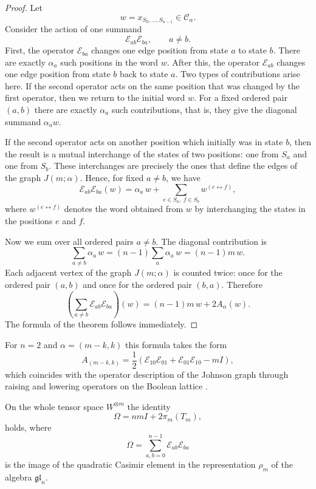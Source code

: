 \documentclass[12pt,reqno]{amsart}
\begin{document}
\begin{proof}
Let
$$
w=x_{S_0,\dots,S_{n-1}}\in\mathcal C_\alpha.
$$
Consider the action of one summand
$$
\mathcal E_{ab}\mathcal E_{ba},
\qquad a\ne b.
$$
First, the operator $\mathcal E_{ba}$ changes one edge position from
state $a$ to state $b$. There are exactly $\alpha_a$ such positions in the
word $w$. After this, the operator $\mathcal E_{ab}$ changes one edge
position from state $b$ back to state $a$. Two types of contributions
arise here. If the second operator acts on the same position that was
changed by the first operator, then we return to the initial word $w$. For
a fixed ordered pair $(a,b)$ there are exactly $\alpha_a$ such
contributions, that is, they give the diagonal summand
$
\alpha_a w.
$

If the second operator acts on another position which initially was in
state $b$, then the result is a mutual interchange of the states of two
positions: one from $S_a$ and one from $S_b$. These interchanges are
precisely the ones that define the edges of the graph $J(m;\alpha)$.
Hence, for fixed $a\ne b$, we have
$$
\mathcal E_{ab}\mathcal E_{ba}(w)
=
\alpha_a\,w
+
\sum_{e\in S_a,\ f\in S_b}
w^{(e\leftrightarrow f)},
$$
where $w^{(e\leftrightarrow f)}$ denotes the word obtained from $w$ by
interchanging the states in the positions $e$ and $f$.

Now we sum over all ordered pairs $a\ne b$. The diagonal contribution is
$$
\sum_{a\ne b}\alpha_a\,w
=
(n-1)\sum_a\alpha_a\,w
=
(n-1)m\,w.
$$
Each adjacent vertex of the graph $J(m;\alpha)$ is counted twice: once for
the ordered pair $(a,b)$ and once for the ordered pair $(b,a)$. Therefore
$$
\left(
\sum_{a\ne b}\mathcal E_{ab}\mathcal E_{ba}
\right)(w)
=
(n-1)m\,w+2A_\alpha(w).
$$
The formula of the theorem follows immediately.
\end{proof}


For $n=2$ and $\alpha=(m-k,k)$ this formula takes the form
$$
A_{(m-k,k)}
=
\frac12
\left(
\mathcal E_{10}\mathcal E_{01}
+
\mathcal E_{01}\mathcal E_{10}
-mI
\right),
$$
which coincides with the operator description of the Johnson graph through
raising and lowering operators on the Boolean lattice
\cite{Stanley1988,Feinsilver2012}.



On the whole tensor space
$W^{\otimes m}$ the identity
\begin{equation*}
\Omega
=
nmI+2\pi_m(T_m),
\end{equation*}
holds, where
$$
\Omega
=
\sum_{a,b=0}^{n-1}
\mathcal E_{ab}\mathcal E_{ba}
$$
is the image of the quadratic Casimir element in the representation
$\rho_m$ of the algebra $\mathfrak{gl}_n$.
\end{document}
